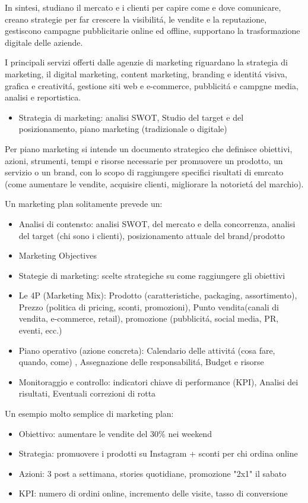 \documentclass{article}
\begin{document}
In sintesi, studiano il mercato e i clienti per capire come e dove comunicare, creano strategie per far crescere la visibilit\'a, le vendite e la reputazione, gestiscono campagne pubblicitarie online ed offline, supportano la trasformazione digitale delle aziende. 

I principali servizi offerti dalle agenzie di marketing riguardano la strategia di marketing, il digital marketing, content marketing, branding e identit\'a visiva, grafica e creativit\'a, gestione siti web e e-commerce, pubblicit\'a e campgne media, analisi e reportistica.

\begin{itemize}
    \item Strategia di marketing: analisi SWOT, Studio del target e del posizionamento, piano marketing (tradizionale o digitale)
\end{itemize}

Per piano marketing si intende un documento strategico che definisce obiettivi, azioni, strumenti, tempi e risorse necessarie per promuovere un prodotto, un servizio o un brand, con lo scopo di raggiungere specifici risultati di emrcato (come aumentare le vendite, acquisire clienti, migliorare la notoriet\'a  del marchio).

Un marketing plan solitamente prevede un:

\begin{itemize}
    \item Analisi di contensto: analisi SWOT, del mercato e della concorrenza, analisi del target (chi sono i clienti), posizionamento attuale del brand/prodotto
    \item Marketing Objectives
    \item Stategie di marketing: scelte strategiche su come raggiungere gli obiettivi
    \item Le 4P (Marketing Mix): Prodotto (caratteristiche, packaging, assortimento), Prezzo (politica di pricing, sconti, promozioni), Punto vendita(canali di vendita, e-commerce, retail), promozione (pubblicit\'a, social media, PR, eventi, ecc.)
    \item Piano operativo (azione concreta): Calendario delle attivit\'a (cosa fare, quando, come) , Assegnazione delle responsabilit\'a, Budget e risorse
    \item Monitoraggio e controllo: indicatori chiave di performance (KPI), Analisi dei risultati, Eventuali correzioni di rotta
\end{itemize}

Un esempio molto semplice di marketing plan:
\begin{itemize}
    \item Obiettivo: aumentare le vendite del 30\% nei weekend
    \item Strategia: promuovere i prodotti su Instagram + sconti per chi ordina online
    \item Azioni: 3 post a settimana, stories quotidiane, promozione "2x1" il sabato
    \item KPI: numero di ordini online, incremento delle visite, tasso di conversione
\end{itemize}
\end{document}
